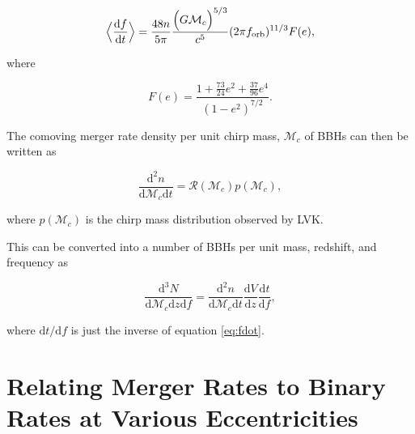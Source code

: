 \documentclass[twocolumn]{aastex631}
\begin{document}
\begin{equation}
    \Big\langle\frac{\mathrm{d}f}{\mathrm{d}t}\Big\rangle = \frac{48 n}{5 \pi} \frac{\Big(G \mathcal{M}_c \Big)^{5/3}}{c^5} (2 \pi f_{\rm orb})^{11/3} F(e), 
    \label{eq:fdot}
\end{equation}

\noindent where 

\begin{equation}
    F(e) = \frac{1 + \frac{73}{24} e^2 + \frac{37}{96} e^4}{(1 - e^2)^{7/2}}.
    \label{eq:eccentricity_enhancement_factor}
\end{equation}

The comoving merger rate density per unit chirp mass, $\mathcal{M}_c$ of BBHs can then be written as

\begin{equation}
    \frac{\mathrm{d}^2n}{\mathrm{d}\mathcal{M}_c \mathrm{d}t} = \mathcal{R}(\mathcal{M}_c) p(\mathcal{M}_c),
    \label{eq:merger_rate_density}
\end{equation}

\noindent where $p(\mathcal{M}_c)$ is the chirp mass distribution observed by LVK. 

This can be converted into a number of BBHs per unit mass, redshift, and frequency as

\begin{equation}
    \frac{\mathrm{d}^3N}{\mathrm{d}\mathcal{M}_c \mathrm{d}z \mathrm{d}f} = \frac{\mathrm{d}^2n}{\mathrm{d}\mathcal{M}_c \mathrm{d}t} \frac{\mathrm{d}V}{\mathrm{d}z} \frac{\mathrm{d}t}{\mathrm{d}f},
    \label{eq:rate_per_freq}
\end{equation}

where $\mathrm{d}t / \mathrm{d}f$ is just the inverse of equation \ref{eq:fdot}.

\section{Relating Merger Rates to Binary Rates at Various Eccentricities}
\end{document}
